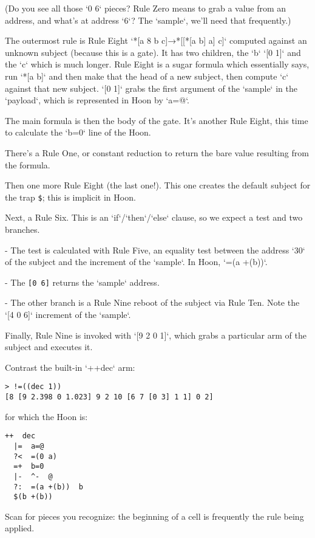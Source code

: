(Do you see all those `0 6` pieces?  Rule Zero means to grab a value from an address, and what's at address `6`?  The `sample`, we'll need that frequently.)

The outermost rule is Rule Eight `*[a 8 b c]→*[[*[a b] a] c]` computed against an unknown subject (because this is a gate).  It has two children, the `b` `[0 1]` and the `c` which is much longer.  Rule Eight is a sugar formula which essentially says, run `*[a b]` and then make that the head of a new subject, then compute `c` against that new subject.  `[0 1]` grabs the first argument of the `sample` in the `payload`, which is represented in Hoon by `a=@`.

The main formula is then the body of the gate.  It's another Rule Eight, this time to calculate the `b=0` line of the Hoon.

There's a Rule One, or constant reduction to return the bare value resulting from the formula.

Then one more Rule Eight (the last one!).  This one creates the default subject for the trap \texttt{\$}; this is implicit in Hoon.

Next, a Rule Six.  This is an `if`/`then`/`else` clause, so we expect a test and two branches.

- The test is calculated with Rule Five, an equality test between the address `30` of the subject and the increment of the `sample`.  In Hoon, `=(a +(b))`.

- The \texttt{[0 6]} returns the `sample` address.

- The other branch is a Rule Nine reboot of the subject via Rule Ten.  Note the `[4 0 6]` increment of the `sample`.

Finally, Rule Nine is invoked with `[9 2 0 1]`, which grabs a particular arm of the subject and executes it.

Contrast the built-in `++dec` arm:

\begin{lstlisting}
> !=((dec 1))
[8 [9 2.398 0 1.023] 9 2 10 [6 7 [0 3] 1 1] 0 2]
\end{lstlisting}

for which the Hoon is:


\begin{lstlisting}
++  dec
  |=  a=@
  ?<  =(0 a)
  =+  b=0
  |-  ^-  @
  ?:  =(a +(b))  b
  $(b +(b))
\end{lstlisting}

Scan for pieces you recognize:  the beginning of a cell is frequently the rule being applied.

